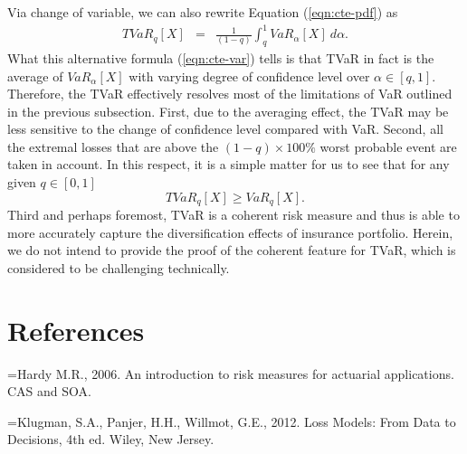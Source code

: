 \documentclass[12pt]{article}
\begin{document}
Via change of variable, we can also rewrite Equation (\ref{eqn:cte-pdf}) as
\begin{eqnarray}
\label{eqn:cte-var}
  TVaR_{q}[X] &=& \frac{1}{(1-q)}\int_{q}^{1} VaR_{\alpha}[X]\ d\alpha.
\end{eqnarray}
What this alternative formula (\ref{eqn:cte-var}) tells is that TVaR in fact is the average of $VaR_{\alpha}[X]$ with varying degree of confidence level over $\alpha\in [q,1]$.  Therefore, the TVaR effectively resolves most of the limitations of VaR outlined in the previous subsection.  First, due to the averaging effect, the TVaR may be less sensitive to the change of confidence level compared with VaR.  Second, all the extremal losses that are above the $(1-q)\times 100\%$ worst probable event are taken in account.  In this respect, it is a simple matter for us to see that for any given $q\in [0,1]$ \[
TVaR_q[X]\geq VaR_q[X].
\]  Third and perhaps foremost, TVaR is a coherent risk measure and thus is able to more accurately capture the diversification effects of insurance portfolio.  Herein, we do not intend to provide  the proof of the coherent feature for TVaR, which is considered to be challenging technically.

\section*{References}

\hangindent=\parindent\noindent Hardy M.R., 2006.   An introduction to risk measures for actuarial applications.
CAS and SOA.

\hangindent=\parindent\noindent Klugman, S.A., Panjer, H.H., Willmot, G.E., 2012.   {Loss Models: From Data to Decisions}, 4th ed.
Wiley, New Jersey.
\end{document}
